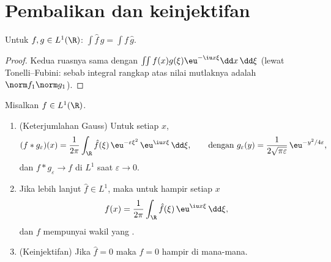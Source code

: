\section{Pembalikan dan keinjektifan}

\begin{lemma}
\label{lem:b3:fouriertransform:multiplication}
Untuk $f, g \in L^1(\R)$: $\displaystyle\int \hat f\,g =
\int f\,\hat g$.
\end{lemma}

\begin{proof}
Kedua ruasnya sama dengan $\iint f(x)g(\xi)\eu^{-\iu x\xi}\dd
x\,\dd\xi$ (lewat Tonelli--Fubini: sebab integral rangkap atas
nilai mutlaknya adalah $\norm f_1\norm g_1$).
\end{proof}

\begin{theorem}[Pembalikan]\label{thm:b3:fouriertransform:inversion}
Misalkan $f \in L^1(\R)$.
\begin{enumerate}
  \item (Keterjumlahan Gauss) Untuk setiap $x$,
        \[
        (f * g_\varepsilon)(x) =
        \frac1{2\pi}\int_\R \hat f(\xi)\,
        \eu^{-\varepsilon\xi^2}\,\eu^{\iu x\xi}\,\dd\xi,
        \qquad\text{dengan } g_\varepsilon(y) =
        \frac{1}{2\sqrt{\pi\varepsilon}}\,
        \eu^{-y^2/4\varepsilon},
        \]
        dan $f * g_\varepsilon \to f$ di $L^1$ saat $\varepsilon
        \to 0$.
  \item Jika lebih lanjut $\hat f \in L^1$, maka untuk hampir setiap
        $x$
        \[
        f(x) = \frac{1}{2\pi}\int_\R \hat
        f(\xi)\,\eu^{\iu x\xi}\,\dd\xi ,
        \]
        dan $f$ mempunyai wakil yang .
  \item (Keinjektifan) Jika $\hat f = 0$ maka $f = 0$ hampir di mana-mana.
\end{enumerate}
\end{theorem}

